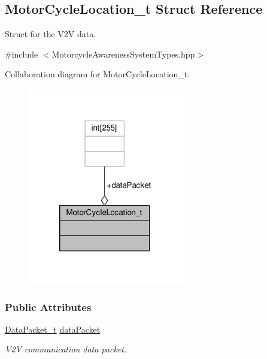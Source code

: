 \hypertarget{structMotorCycleLocation__t}{\subsection{Motor\-Cycle\-Location\-\_\-t Struct Reference}
\label{structMotorCycleLocation__t}
}


Struct for the V2\-V data.  




{\ttfamily \#include $<$Motorcycle\-Awareness\-System\-Types.\-hpp$>$}



Collaboration diagram for Motor\-Cycle\-Location\-\_\-t\-:\nopagebreak
\begin{figure}[H]
\begin{center}
\leavevmode
\includegraphics[width=194pt]{structMotorCycleLocation__t__coll__graph}
\end{center}
\end{figure}
\subsubsection*{Public Attributes}
\begin{DoxyCompactItemize}
\item 
\hyperlink{MotorcycleAwarenessSystemTypes_8hpp_ac0eb6e9beb8fa8db296c699fcc8494e6}{Data\-Packet\-\_\-t} \hyperlink{structMotorCycleLocation__t_a1f854587b19dbe91dffd637ce70be62e}{data\-Packet}
\begin{DoxyCompactList}\small\item\em V2\-V communication data packet. \end{DoxyCompactList}\end{DoxyCompactItemize}


